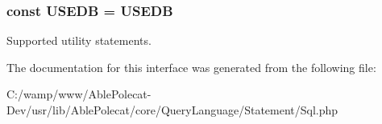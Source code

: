 \subsubsection[{U\+S\+E\+D\+B}]{\setlength{\rightskip}{0pt plus 5cm}const U\+S\+E\+D\+B = \textquotesingle{}U\+S\+E\+D\+B\textquotesingle{}}\label{interface_able_polecat___query_language___statement___sql___interface_a21b349e017407dd48cf65bddb39a4766}
Supported utility statements. 

The documentation for this interface was generated from the following file\+:\begin{DoxyCompactItemize}
\item 
C\+:/wamp/www/\+Able\+Polecat-\/\+Dev/usr/lib/\+Able\+Polecat/core/\+Query\+Language/\+Statement/Sql.\+php\end{DoxyCompactItemize}

